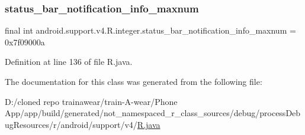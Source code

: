 \subsubsection{\texorpdfstring{status\_bar\_notification\_info\_maxnum}{status\_bar\_notification\_info\_maxnum}}
{\footnotesize\ttfamily final int android.\+support.\+v4.\+R.\+integer.\+status\+\_\+bar\+\_\+notification\+\_\+info\+\_\+maxnum = 0x7f09000a\hspace{0.3cm}{\ttfamily [static]}}



Definition at line 136 of file R.\+java.



The documentation for this class was generated from the following file\+:\begin{DoxyCompactItemize}
\item 
D\+:/cloned repo trainawear/train-\/\+A-\/wear/\+Phone App/app/build/generated/not\+\_\+namespaced\+\_\+r\+\_\+class\+\_\+sources/debug/process\+Debug\+Resources/r/android/support/v4/\mbox{\hyperlink{process_debug_resources_2r_2android_2support_2v4_2_r_8java}{R.\+java}}\end{DoxyCompactItemize}

